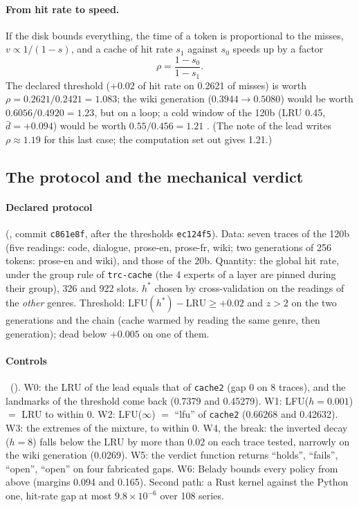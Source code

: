 \paragraph{From hit rate to speed.} If the disk bounds everything, the time of a token is proportional to the misses, $v \propto 1/(1-s)$, and a cache of hit rate $s_1$ against $s_0$ speeds up by a factor
\begin{equation}\label{t3mim:eq:vitesse}
\rho = \frac{1 - s_0}{1 - s_1}.
\end{equation}
The declared threshold ($+0.02$ of hit rate on 0.2621 of misses) is worth $\rho = 0.2621/0.2421 = 1.083$; the wiki generation ($0.3944 \to 0.5080$) would be worth $0.6056/0.4920 = 1.23$, but on a loop; a cold window of the 120b (LRU 0.45, $\bar d = +0.094$) would be worth $0.55/0.456 = 1.21$ \calc. (The note of the lead writes $\rho \approx 1.19$ for this last case; the computation set out gives 1.21.)

\subsection{The protocol and the mechanical verdict}\label{t3mim:sec:p1-verdict}

\paragraph{Declared protocol} (, commit \texttt{c861e8f}, after the thresholds \texttt{ec124f5}). Data: seven traces of the 120b (five readings: code, dialogue, prose-en, prose-fr, wiki; two generations of 256 tokens: prose-en and wiki), and those of the 20b. Quantity: the global hit rate, under the group rule of \texttt{trc-cache} (the 4 experts of a layer are pinned during their group), 326 and 922 slots. $h^\ast$ chosen by cross-validation on the readings of the \emph{other} genres. Threshold: $\mathrm{LFU}(h^\ast) - \mathrm{LRU} \ge +0.02$ and $z > 2$ on the two generations and the chain (cache warmed by reading the same genre, then generation); dead below $+0.005$ on one of them.

\paragraph{Controls} \mes~(). W0: the LRU of the lead equals that of \texttt{cache2} (gap 0 on 8 traces), and the landmarks of the threshold come back (0.7379 and 0.45279). W1: LFU($h = 0.001$) $=$ LRU to within 0. W2: LFU($\infty$) $=$ ``lfu'' of \texttt{cache2} (0.66268 and 0.42632). W3: the extremes of the mixture, to within 0. W4, the break: the inverted decay ($h = 8$) falls below the LRU by more than 0.02 on each trace tested, narrowly on the wiki generation (0.0269). W5: the verdict function returns ``holds'', ``fails'', ``open'', ``open'' on four fabricated gaps. W6: Belady \cite{belady1966} bounds every policy from above (margins 0.094 and 0.165). Second path: a Rust kernel against the Python one, hit-rate gap at most $9.8 \times 10^{-6}$ over 108 series.

